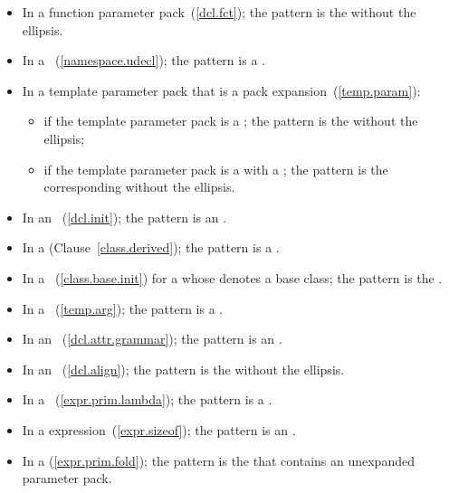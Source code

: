 \begin{itemize}
\item In a function parameter pack~(\ref{dcl.fct}); the pattern is the
 without the ellipsis.

\item In a ~(\ref{namespace.udecl});
the pattern is a .

\item In a template parameter pack that is a pack expansion~(\ref{temp.param}):

\begin{itemize}
\item if the template parameter pack is a ;
the pattern is the  without the ellipsis;

\item if the template parameter pack is a  with a
; the pattern is the corresponding
 without the ellipsis.
\end{itemize}

\item In an ~(\ref{dcl.init});
the pattern is an .

\item In a  (Clause~\ref{class.derived});
the pattern is a .

\item In a ~(\ref{class.base.init}) for a
 whose  denotes a
base class; the pattern is the .

\item In a ~(\ref{temp.arg});
the pattern is a .

\item In an ~(\ref{dcl.attr.grammar}); the pattern is
an .

\item In an ~(\ref{dcl.align}); the pattern is
the  without the ellipsis.

\item In a ~(\ref{expr.prim.lambda}); the pattern is
a .

\item In a  expression~(\ref{expr.sizeof}); the pattern is an
.

\item In a  (\ref{expr.prim.fold});
the pattern is the 
that contains an unexpanded parameter pack.
\end{itemize}

